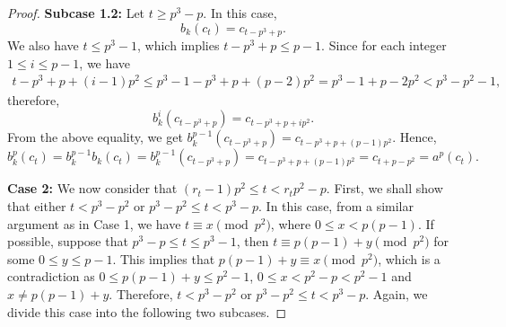\documentclass[11pt]{amsart}
\theoremstyle{plain}
\numberwithin{equation}{section}
\begin{document}
\begin{proof}
\textbf{Subcase 1.2:} Let $t \geq p^3-p$. In this case,
\[
b_{k}(c_t)=c_{t-p^3+p}.
\]
We also have $t \leq p^3-1$, which implies $t-p^3+p \leq p-1$. Since for each integer $1 \leq i \leq p-1$, we have
\begin{equation*}
\begin{split}
t-p^3+p+(i-1)p^2 \leq p^3-1-p^3+p+(p-2)p^2=p^3-1+p-2p^2<p^3-p^2-1,
\end{split}
\end{equation*}
therefore,
\[
b_{k}^{i}(c_{t-p^3+p})=c_{t-p^3+p+ip^2}.
\]
From the above equality, we get $b_{k}^{p-1}(c_{t-p^3+p})=c_{t-p^3+p+(p-1)p^2}$. Hence,
 \[
 b_{k}^{p}(c_t)=b_k^{p-1}b_k(c_t)=b_k^{p-1}(c_{t-p^3+p})=c_{t-p^3+p+(p-1)p^2}=c_{t+p-p^2}=a^{p}(c_t).
 \]

\textbf{Case 2:} We now consider that $(r_t-1)p^2 \leq t < r_tp^{2}-p$. First, we shall show that either $t<p^3-p^2$ or $ p^3-p^2 \leq t <p^3-p$. In this case, from a similar argument as in Case 1, we have $t \equiv x \pmod {p^2}$, where $0 \leq x <p(p-1)$. If possible, suppose that  $p^3-p \leq t \leq p^3-1$, then $t \equiv p(p-1)+y \pmod {p^2}$ for some $0 \leq y \leq p-1$. This implies that $p(p-1)+y \equiv x \pmod {p^2}$, which is a contradiction as $0 \leq p(p-1)+y \leq p^2-1$, $0 \leq x <p^2-p<p^2-1$ and $ x\neq p(p-1)+y$. Therefore, $t<p^3-p^2$ or $ p^3-p^2 \leq t <p^3-p$. Again, we divide this case into the following two subcases.


\end{proof}
\end{document}
